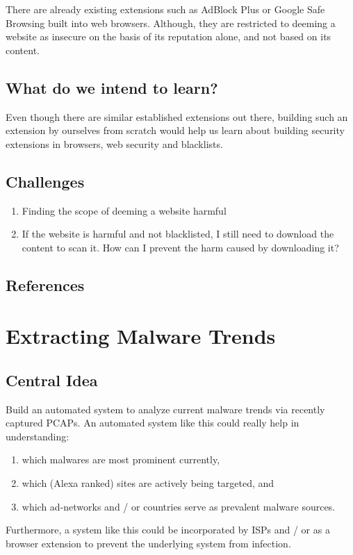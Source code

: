 \documentclass[a4paper]{article}
\begin{document}
There are already existing extensions such as AdBlock Plus or Google Safe Browsing built into web browsers. Although, they are restricted to deeming a website as insecure on the basis of its reputation alone, and not based on its content.

\subsection{What do we intend to learn?}

Even though there are similar established extensions out there, building such an extension by ourselves from scratch would help us learn about building security extensions in browsers, web security and blacklists.

\subsection{Challenges}
\begin{enumerate}
\item Finding the scope of deeming a website harmful

\item If the website is harmful and not blacklisted, I still need to download the content to scan it. How can I prevent the harm caused by downloading it?
\end{enumerate}

\subsection{References}

\section{Extracting Malware Trends}
\subsection{Central Idea}
Build an automated system to analyze current malware trends via recently captured PCAPs. An automated system like this could really help in understanding:
\begin{enumerate}
\item which malwares are most prominent currently, 
\item which (Alexa ranked) sites are actively being targeted, and 
\item which ad-networks and / or countries serve as prevalent malware sources. 
\end{enumerate}
Furthermore, a system like this could be incorporated by ISPs and / or as a browser extension to prevent the underlying system from infection.
\end{document}

